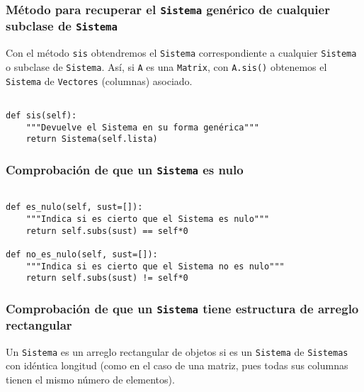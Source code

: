 \documentclass[11pt]{report}
\begin{document}
\subsubsection{Método para recuperar el \texttt{Sistema} genérico de cualquier subclase de \texttt{Sistema}}
\label{sec:orgb3dda27}

Con el método \texttt{sis} obtendremos el \texttt{Sistema} correspondiente a
cualquier \texttt{Sistema} o subclase de \texttt{Sistema}. Así, si \texttt{A} es una
\texttt{Matrix}, con \texttt{A.sis()} obtenemos el \texttt{Sistema} de \texttt{Vectores}
(columnas) asociado.

\begin{verbatim}

def sis(self):
    """Devuelve el Sistema en su forma genérica"""
    return Sistema(self.lista)

\end{verbatim}

\subsubsection{Comprobación de que un \texttt{Sistema} es nulo}
\label{sec:org816766f}


\begin{verbatim}

def es_nulo(self, sust=[]):
    """Indica si es cierto que el Sistema es nulo"""
    return self.subs(sust) == self*0

def no_es_nulo(self, sust=[]):
    """Indica si es cierto que el Sistema no es nulo"""
    return self.subs(sust) != self*0

\end{verbatim}

\subsubsection{Comprobación de que un \texttt{Sistema}  tiene estructura de arreglo rectangular}
\label{sec:org70ab244}

Un \texttt{Sistema} es un arreglo rectangular de objetos si es un \texttt{Sistema}
de \texttt{Sistemas} con idéntica longitud (como en el caso de una matriz,
pues todas sus columnas tienen el mismo número de elementos).
\end{document}
